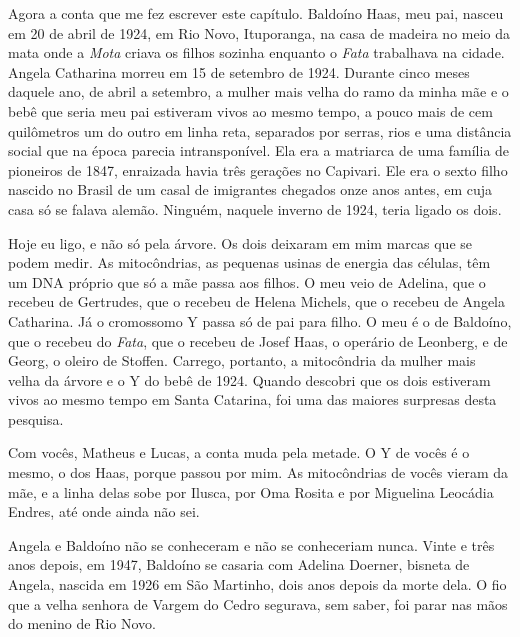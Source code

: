 \documentclass[
  brazilian,
  11pt,
  openany]{book}
\begin{document}
Agora a conta que me fez escrever este capítulo. Baldoíno Haas, meu pai,
nasceu em 20 de abril de 1924, em Rio Novo, Ituporanga, na casa de
madeira no meio da mata onde a \emph{Mota} criava os filhos sozinha
enquanto o \emph{Fata} trabalhava na cidade. Angela Catharina morreu em
15 de setembro de 1924. Durante cinco meses daquele ano, de abril a
setembro, a mulher mais velha do ramo da minha mãe e o bebê que seria
meu pai estiveram vivos ao mesmo tempo, a pouco mais de cem quilômetros
um do outro em linha reta, separados por serras, rios e uma distância
social que na época parecia intransponível. Ela era a matriarca de uma
família de pioneiros de 1847, enraizada havia três gerações no Capivari.
Ele era o sexto filho nascido no Brasil de um casal de imigrantes
chegados onze anos antes, em cuja casa só se falava alemão. Ninguém,
naquele inverno de 1924, teria ligado os dois.

Hoje eu ligo, e não só pela árvore. Os dois deixaram em mim marcas que
se podem medir. As mitocôndrias, as pequenas usinas de energia das
células, têm um DNA próprio que só a mãe passa aos filhos. O meu veio de
Adelina, que o recebeu de Gertrudes, que o recebeu de Helena Michels,
que o recebeu de Angela Catharina. Já o cromossomo Y passa só de pai
para filho. O meu é o de Baldoíno, que o recebeu do \emph{Fata}, que o
recebeu de Josef Haas, o operário de Leonberg, e de Georg, o oleiro de
Stoffen. Carrego, portanto, a mitocôndria da mulher mais velha da árvore
e o Y do bebê de 1924. Quando descobri que os dois estiveram vivos ao
mesmo tempo em Santa Catarina, foi uma das maiores surpresas desta
pesquisa.

Com vocês, Matheus e Lucas, a conta muda pela metade. O Y de vocês é o
mesmo, o dos Haas, porque passou por mim. As mitocôndrias de vocês
vieram da mãe, e a linha delas sobe por Ilusca, por Oma Rosita e por
Miguelina Leocádia Endres, até onde ainda não sei.

Angela e Baldoíno não se conheceram e não se conheceriam nunca. Vinte e
três anos depois, em 1947, Baldoíno se casaria com Adelina Doerner,
bisneta de Angela, nascida em 1926 em São Martinho, dois anos depois da
morte dela. O fio que a velha senhora de Vargem do Cedro segurava, sem
saber, foi parar nas mãos do menino de Rio Novo.
\end{document}
